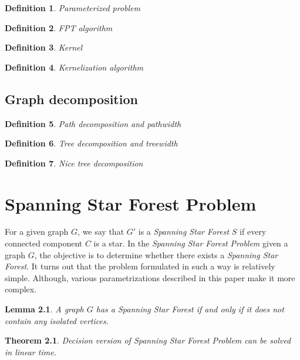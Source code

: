 \documentclass[en]{pracamgr}
\newtheorem{defi}{Definition}
\newtheorem{theorem}{Theorem}
\newtheorem{lemma}{Lemma}
\begin{document}
\begin{defi}\label{Parameterized problem}
	Parameterized problem
\end{defi}

\begin{defi}\label{FPT algorithm}
	FPT algorithm
\end{defi}

\begin{defi}\label{Kernel}
	Kernel
\end{defi}

\begin{defi}\label{Kernelization algorithm}
	Kernelization algorithm
\end{defi}

\section{Graph decomposition}

\begin{defi}\label{Pathwidth}
	Path decomposition and pathwidth
\end{defi}

\begin{defi}\label{Treewidth}
	Tree decomposition and treewidth
\end{defi}

\begin{defi}\label{nice tree decomposition}
	Nice tree decomposition
\end{defi}

\chapter{Spanning Star Forest Problem}\label{r:losers}

For a given graph $G$, we say that $G'$ is a \emph{Spanning Star Forest} $S$
if every connected component $C$ is a star. In the 
\emph{Spanning Star Forest Problem} given a graph $G$, the objective is
to determine whether there exists a \emph{Spanning Star Forest}. It turns
out that the problem formulated in such a way is relatively simple. Although, 
various parametrizations described in this paper make it more complex.

\begin{lemma}\label{SSF lemma}
 A graph $G$ has a Spanning Star Forest if and only if it does not contain
 any isolated vertices.
\end{lemma}

\begin{theorem}
	Decision version of Spanning Star Forest Problem can be solved in linear
	time.
\end{theorem}
\end{document}
